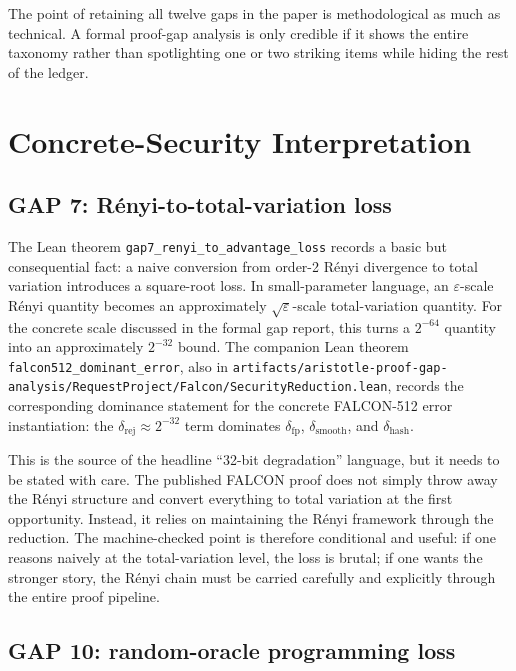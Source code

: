 \documentclass[11pt]{article}
\begin{document}
The point of retaining all twelve gaps in the paper is methodological as much as technical. A formal proof-gap analysis is only credible if it shows the entire taxonomy rather than spotlighting one or two striking items while hiding the rest of the ledger.

\section{Concrete-Security Interpretation}

\subsection*{GAP 7: R\'{e}nyi-to-total-variation loss}

The Lean theorem \texttt{gap7\_renyi\_to\_advantage\_loss} records a basic but consequential fact: a naive conversion from order-2 R\'{e}nyi divergence to total variation introduces a square-root loss. In small-parameter language, an $\varepsilon$-scale R\'{e}nyi quantity becomes an approximately $\sqrt{\varepsilon}$-scale total-variation quantity. For the concrete scale discussed in the formal gap report, this turns a $2^{-64}$ quantity into an approximately $2^{-32}$ bound. The companion Lean theorem \texttt{falcon512\_dominant\_error}, also in \texttt{artifacts/aristotle-proof-gap-analysis/RequestProject/Falcon/SecurityReduction.lean}, records the corresponding dominance statement for the concrete FALCON-512 error instantiation: the $\delta_{\mathrm{rej}} \approx 2^{-32}$ term dominates $\delta_{\mathrm{fp}}$, $\delta_{\mathrm{smooth}}$, and $\delta_{\mathrm{hash}}$.

This is the source of the headline ``32-bit degradation'' language, but it needs to be stated with care. The published FALCON proof does not simply throw away the R\'{e}nyi structure and convert everything to total variation at the first opportunity. Instead, it relies on maintaining the R\'{e}nyi framework through the reduction. The machine-checked point is therefore conditional and useful: if one reasons naively at the total-variation level, the loss is brutal; if one wants the stronger story, the R\'{e}nyi chain must be carried carefully and explicitly through the entire proof pipeline.

\subsection*{GAP 10: random-oracle programming loss}
\end{document}
